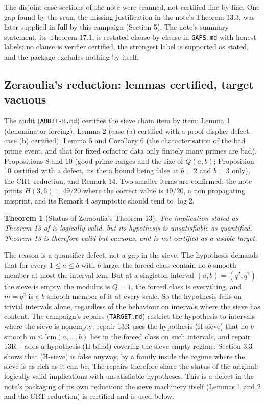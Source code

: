 \documentclass[11pt]{article}
\newtheorem{theorem}{Theorem}[section]
\theoremstyle{remark}
\begin{document}
The disjoint case sections of the note were scanned, not certified line by line. One gap found by the scan, the missing justification in the note's Theorem 13.3, was later supplied in full by this campaign (Section 5). The note's summary statement, its Theorem 17.1, is restated clause by clause in \texttt{GAPS.md} with honest labels: no clause is verifier certified, the strongest label is supported as stated, and the package excludes nothing by itself.

\subsection{Zeraoulia's reduction: lemmas certified, target vacuous}

The audit (\texttt{AUDIT-B.md}) certifies the sieve chain item by item: Lemma 1 (denominator forcing), Lemma 2 (case (a) certified with a proof display defect; case (b) certified), Lemma 5 and Corollary 6 (the characterisation of the bad prime event, and that for fixed cofactor data only finitely many primes are bad), Propositions 8 and 10 (good prime ranges and the size of $Q(a,b)$; Proposition 10 certified with a defect, its theta bound being false at $b = 2$ and $b = 3$ only), the CRT reduction, and Remark 14. Two smaller items are confirmed: the note prints $H(3,6) = 49/20$ where the correct value is $19/20$, a non propagating misprint, and its Remark 4 asymptotic should tend to $\log 2$.

\begin{theorem}[Status of Zeraoulia's Theorem 13]
The implication stated as Theorem 13 of \cite{zeraoulia} is logically valid, but its hypothesis is unsatisfiable as quantified. Theorem 13 is therefore valid but vacuous, and is not certified as a usable target.
\end{theorem}

The reason is a quantifier defect, not a gap in the sieve. The hypothesis demands that for every $1 \le a \le b$ with $b$ large, the forced class contain no $b$-smooth member at most the interval lcm. But at a singleton interval $(a,b) = (q^2, q^2)$ the sieve is empty, the modulus is $Q = 1$, the forced class is everything, and $m = q^2$ is a $b$-smooth member of it at every scale. So the hypothesis fails on trivial intervals alone, regardless of the behaviour on intervals where the sieve has content. The campaign's repairs (\texttt{TARGET.md}) restrict the hypothesis to intervals where the sieve is nonempty: repair 13R uses the hypothesis (H-sieve) that no $b$-smooth $m \le \mathrm{lcm}(a,\dots,b)$ lies in the forced class on such intervals, and repair 13R+ adds a hypothesis (H-blind) covering the sieve empty regime. Section 3.3 shows that (H-sieve) is false anyway, by a family inside the regime where the sieve is as rich as it can be. The repairs therefore share the status of the original: logically valid implications with unsatisfiable hypotheses. This is a defect in the note's packaging of its own reduction; the sieve machinery itself (Lemmas 1 and 2 and the CRT reduction) is certified and is used below.
\end{document}
